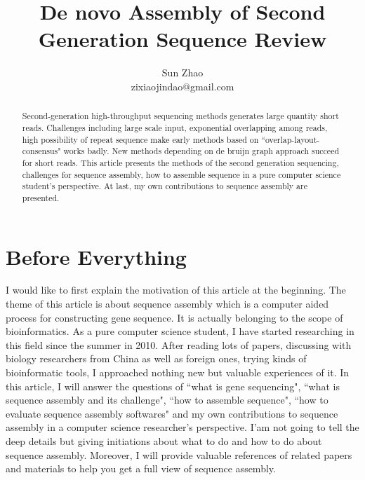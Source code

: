\documentclass{article}
\title{De novo Assembly of Second Generation Sequence Review}
\author{Sun Zhao\\zixiaojindao@gmail.com}
\begin{document}
\maketitle
\newpage

\begin{abstract}
Second-generation high-throughput sequencing methods generates large quantity short reads. Challenges including large scale input, exponential overlapping among reads, high possibility of repeat sequence make early methods based on ``overlap-layout-consensus" works badly. New methods depending on de bruijn graph approach succeed for short reads. This article presents the methods of the second generation sequencing, challenges for sequence assembly, how to assemble sequence in a pure computer science student's perspective. At last, my own contributions to sequence assembly are presented.
\end{abstract}

\section{Before Everything}
I would like to first explain the motivation of this article at the beginning. The theme of this article is about sequence assembly which is a computer aided process for constructing gene sequence. It is actually belonging to the scope of bioinformatics. As a pure computer science student, I have started researching in this field since the summer in 2010. After reading lots of papers, discussing with biology researchers from China as well as foreign ones, trying kinds of bioinformatic tools, I approached nothing new but valuable experiences of it. In this article, I will answer the questions of ``what is gene sequencing", ``what is sequence assembly and its challenge", ``how to assemble sequence", ``how to evaluate sequence assembly softwares" and my own contributions to sequence assembly in a computer science researcher's perspective. I'am not going to tell the deep details but giving initiations about what to do and how to do about sequence assembly. Moreover, I will provide valuable references of related papers and materials to help you get a full view of sequence assembly.
\end{document}
